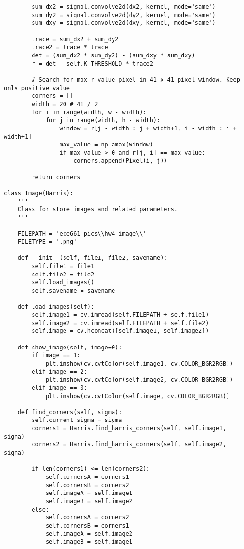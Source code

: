\documentclass[11pt]{article}
\begin{document}
\begin{lstlisting}
        sum_dx2 = signal.convolve2d(dx2, kernel, mode='same')
        sum_dy2 = signal.convolve2d(dy2, kernel, mode='same')
        sum_dxy = signal.convolve2d(dxy, kernel, mode='same')

        trace = sum_dx2 + sum_dy2
        trace2 = trace * trace
        det = (sum_dx2 * sum_dy2) - (sum_dxy * sum_dxy)
        r = det - self.K_THRESHOLD * trace2

        # Search for max r value pixel in 41 x 41 pixel window. Keep only positive value
        corners = []
        width = 20 # 41 / 2
        for i in range(width, w - width):
            for j in range(width, h - width):
                window = r[j - width : j + width+1, i - width : i + width+1]
                max_value = np.amax(window)
                if max_value > 0 and r[j, i] == max_value:
                    corners.append(Pixel(i, j))
        
        return corners

class Image(Harris):
    ''' 
    Class for store images and related parameters.
    '''

    FILEPATH = 'ece661_pics\\hw4_image\\'
    FILETYPE = '.png'

    def __init__(self, file1, file2, savename):
        self.file1 = file1
        self.file2 = file2
        self.load_images()
        self.savename = savename

    def load_images(self):
        self.image1 = cv.imread(self.FILEPATH + self.file1)
        self.image2 = cv.imread(self.FILEPATH + self.file2)
        self.image = cv.hconcat([self.image1, self.image2])

    def show_image(self, image=0):
        if image == 1:
            plt.imshow(cv.cvtColor(self.image1, cv.COLOR_BGR2RGB))
        elif image == 2:
            plt.imshow(cv.cvtColor(self.image2, cv.COLOR_BGR2RGB))
        elif image == 0:
            plt.imshow(cv.cvtColor(self.image, cv.COLOR_BGR2RGB))

    def find_corners(self, sigma):
        self.current_sigma = sigma
        corners1 = Harris.find_harris_corners(self, self.image1, sigma)
        corners2 = Harris.find_harris_corners(self, self.image2, sigma)

        if len(corners1) <= len(corners2):
            self.cornersA = corners1
            self.cornersB = corners2
            self.imageA = self.image1
            self.imageB = self.image2
        else:
            self.cornersA = corners2
            self.cornersB = corners1
            self.imageA = self.image2
            self.imageB = self.image1
        

\end{lstlisting}
\end{document}
